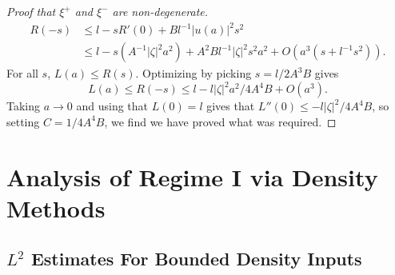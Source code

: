 \begin{proof}[Proof that $\xi^+$ and $\xi^-$ are non-degenerate]
    \begin{equation}
    \begin{split}
        R(-s) &\leq l - s R'(0) + B l^{-1} |u(a)|^2 s^2\\
        &\leq l - s ( A^{-1} |\zeta|^2 a^2 ) + A^2 B l^{-1} |\zeta|^2 s^2 a^2 + O(a^3 ( s + l^{-1} s^2)).
    \end{split}
    \end{equation}
    For all $s$, $L(a) \leq R(s)$. Optimizing by picking $s = l / 2 A^3 B$ gives
    \begin{equation}
        L(a) \leq R(-s) \leq l - l |\zeta|^2 a^2 / 4 A^4 B + O( a^3 ).
    \end{equation}
    Taking $a \to 0$ and using that $L(0) = l$ gives that $L''(0) \leq - l |\zeta|^2 / 4 A^4 B$, so setting $C = 1/4 A^4 B$, we find we have proved what was required.
\end{proof}

\section{Analysis of Regime I via Density Methods} \label{regime1firstsection}

\subsection{$L^2$ Estimates For Bounded Density Inputs}

